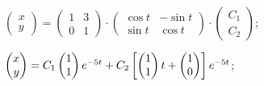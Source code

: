 \begin{enumsolsfull}
		\item \( \begin{pmatrix} x \\ y \end{pmatrix} = \begin{pmatrix} 1 & 3 \\ 0 & 1 \end{pmatrix} \cdot \begin{pmatrix} \cos{t} & -\sin{t} \\ \sin{t} & \cos{t} \end{pmatrix} \cdot \begin{pmatrix} C_1 \\ C_2 \end{pmatrix} \); %
		\item \( \begin{pmatrix} x \\ y \end{pmatrix} = C_1 \begin{pmatrix} 1 \\ 1 \end{pmatrix} e^{-5t} + C_2 \left[ \begin{pmatrix} 1 \\ 1 \end{pmatrix}t + \begin{pmatrix} 1 \\ 0 \end{pmatrix} \right] e^{-5t} \); %

\end{enumsolsfull}
